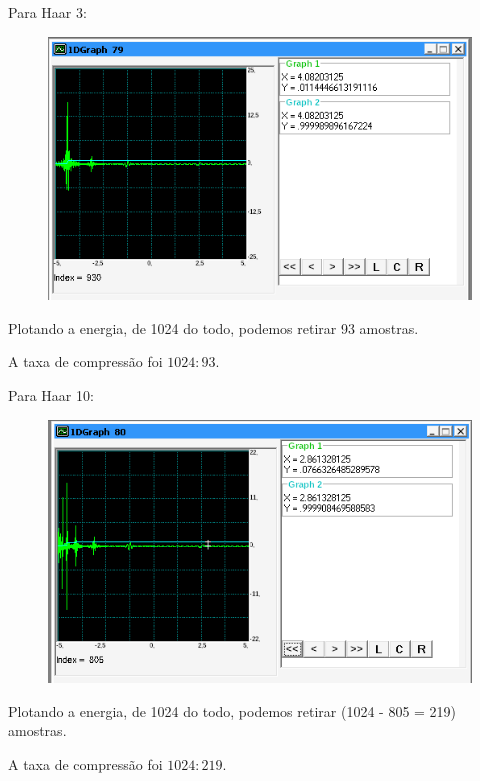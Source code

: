 \documentclass[10pt]{article}
\begin{document}
Para Haar 3:
\begin{figure}[h]
    \includegraphics[scale=0.5]{haar3.png}
    \centering
    \caption{}
\end{figure}

Plotando a energia, de 1024 do todo, podemos retirar 93 amostras.

A taxa de compressão foi $1024:93$.

Para Haar 10:
\begin{figure}[h]
    \includegraphics[scale=0.5]{haar10.png}
    \centering
    \caption{}
\end{figure}

Plotando a energia, de 1024 do todo, podemos retirar (1024 - 805 = 219) amostras.

A taxa de compressão foi $1024:219$.

\newpage
\end{document}
